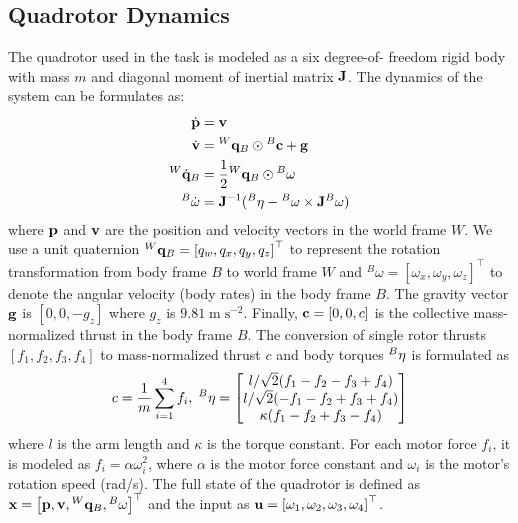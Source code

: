 \documentclass[letterpaper,journal,twoside]{IEEEtran}
\begin{document}
\subsection{Quadrotor Dynamics}
The quadrotor used in the task is modeled as a six degree-of-
freedom rigid body with mass $m$ and diagonal moment of 
inertial matrix $\mathbf{J}$.
The dynamics of the system can be formulates as: 
\begin{equation}
\label{eq:quadrotor_system}
\begin{aligned}
  \dot{\mathbf{p}} &= \mathbf{v}
  \\  
  \dot{\mathbf{v}} &= {}^W\mathbf{q}_B \odot {}^B\mathbf{c} + \mathbf{g}
  \\
  {}^W\dot{\mathbf{q}}_B &= \frac{1}{2} {}^W\mathbf{q}_B \odot {}^B\mathbf{\omega}
  \\
  {}^B\dot{\mathbf{\omega}} &= 
  \mathbf{J}^{-1}({}^B\mathbf{\eta} - {}^B\mathbf{\omega} \times \mathbf{J}{}^B\mathbf{\omega})
\end{aligned}
\end{equation}
where $\mathbf{p}$ and $\mathbf{v}$ are the position and velocity 
vectors in the world frame $W$. 
We use a unit quaternion 
${}^W\mathbf{q}_B = \left[q_w, q_x, q_y, q_z\right]^\top$ 
to represent the rotation transformation from body frame 
$B$ to world frame $W$
and 
${}^B\omega = \left[\omega_x, \omega_y, \omega_z\right]^\top$ to denote the angular velocity (body rates) in the 
body frame $B$.
The gravity vector $\mathbf{g}$ is $\left[0,0,-g_z\right]$ where
$g_z$ is $9.81\;\text{m}\;\text{s}^{-2}$.
Finally, $\mathbf{c} = \left[0,0,c\right]$ is the collective 
mass-normalized thrust in the body frame $B$. 
The conversion of single rotor thrusts 
$\left[f_1, f_2, f_3, f_4\right]$ to 
mass-normalized thrust $c$ 
and body torques ${}^B\mathbf{\eta}$ is formulated as
\[
  c = \frac{1}{m}\sum_{i=1}^4 f_i,\;
  {}^B\mathbf{\eta} = 
  \begin{bmatrix}
    l/\sqrt{2}(f_1 - f_2 - f_3 + f_4) \\
    l/\sqrt{2}(-f_1 - f_2 + f_3 + f_4) \\
    \kappa(f_1 - f_2 + f_3 - f_4)
  \end{bmatrix}
\]
where $l$ is the arm length and $\kappa$ is the torque 
constant.
For each motor force $f_i$, it is modeled as 
$f_i = \alpha \omega_i^2$, where $\alpha$ is the motor 
force constant and $\omega_i$ is the motor's rotation speed
(rad/s).
The full state of the quadrotor is defined as 
$\mathbf{x} = \left[\mathbf{p}, \mathbf{v}, {}^W{\mathbf{q}}_B, 
{}^B\mathbf{\omega}\right]^\top$ and the input as 
$\mathbf{u} = \left[\omega_1, \omega_2, \omega_3, 
\omega_4\right]^\top$.
\end{document}
